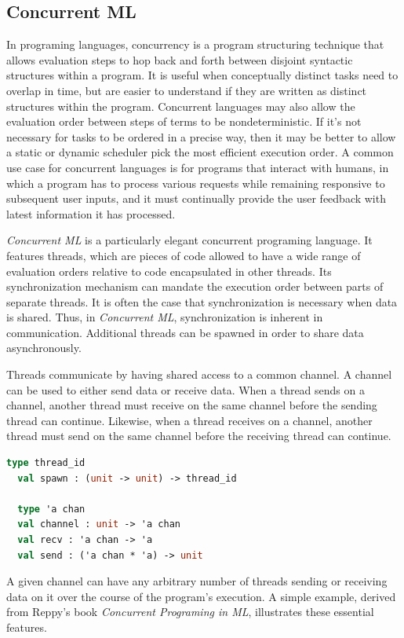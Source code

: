 \documentclass[letterpaper, 11pt]{extarticle}
\begin{document}
\subsection{Concurrent ML}
In programing languages, concurrency is a program structuring technique that allows evaluation
steps to hop back and forth between disjoint syntactic structures within a program.
It is useful
when conceptually distinct tasks need to overlap in time, but are easier to understand if they
are written as distinct structures within the program. Concurrent languages may also allow the
evaluation order between steps of terms to be nondeterministic. If it's not necessary for
tasks to be ordered in a precise way, then it may be better to allow a static or dynamic
scheduler pick the most efficient execution order. A common use case for concurrent languages
is for programs that interact with humans, in which a program has to process various requests
while remaining responsive to subsequent user inputs, and it must continually provide the user
feedback with latest information it has processed.

\textit{Concurrent ML} is a particularly elegant concurrent programing language.
It features threads, which are pieces of code allowed to have a wide range of
evaluation orders relative to code encapsulated in other threads. Its synchronization
mechanism can mandate the execution order between parts of separate threads. It is often the
case that synchronization is necessary when data is shared. Thus, in \textit{Concurrent ML},
synchronization is inherent in communication. Additional threads can be spawned
in order to share data asynchronously.

Threads communicate by having shared access to a common channel. A channel can be used to
either send data or receive data.  When a thread sends on a channel, another thread must
receive on the same channel before the sending thread can continue.  Likewise, when a thread
receives on a channel, another thread must send on the same channel before the receiving thread
can continue.

\begin{lstlisting}[language=ML]
  type thread_id
  val spawn : (unit -> unit) -> thread_id

  type 'a chan
  val channel : unit -> 'a chan
  val recv : 'a chan -> 'a
  val send : ('a chan * 'a) -> unit
  \end{lstlisting}

A given channel can have any arbitrary number of threads sending or receiving data on it over
the course of the program's execution. A simple example, derived from Reppy's book
\textit{Concurrent Programing in ML}, illustrates these essential
features.
\end{document}
